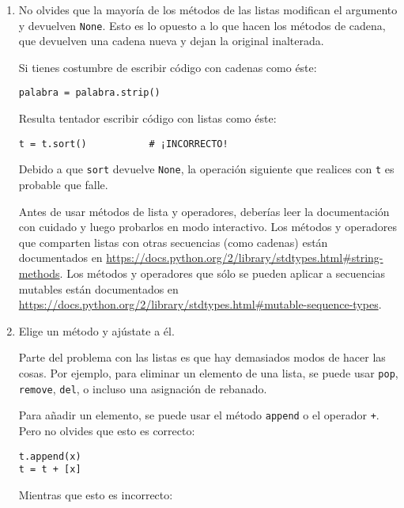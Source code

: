 \begin{enumerate}

\item No olvides que la mayoría de los métodos de las listas modifican el argumento y
devuelven {\tt None}. Esto es lo opuesto a lo que hacen los métodos de cadena,
que devuelven una cadena nueva y dejan la original inalterada.

Si tienes costumbre de escribir código con cadenas como éste:

\beforeverb
\begin{verbatim}
palabra = palabra.strip()
\end{verbatim}
\afterverb

Resulta tentador escribir código con listas como éste:

\beforeverb
\begin{verbatim}
t = t.sort()           # ¡INCORRECTO!
\end{verbatim}
\afterverb


Debido a que {\tt sort} devuelve {\tt None}, la operación
siguiente que realices con {\tt t} es probable que falle.

Antes de usar métodos de lista y operadores, deberías leer la
documentación con cuidado y luego probarlos en modo interactivo. Los
métodos y operadores que comparten listas con otras secuencias (como
cadenas) están documentados en
\url{https://docs.python.org/2/library/stdtypes.html#string-methods}.
Los métodos y operadores que sólo se pueden aplicar a secuencias mutables
están documentados en
\url{https://docs.python.org/2/library/stdtypes.html#mutable-sequence-types}.


\item Elige un método y ajústate a él.

Parte del problema con las listas es que hay demasiados
modos de hacer las cosas. Por ejemplo, para eliminar un elemento de
una lista, se puede usar {\tt pop}, {\tt remove}, {\tt del},
o incluso una asignación de rebanado.

Para añadir un elemento, se puede usar el método {\tt append} o
el operador {\tt +}. Pero no olvides que esto es correcto:

\beforeverb
\begin{verbatim}
t.append(x)
t = t + [x]
\end{verbatim}
\afterverb

Mientras que esto es incorrecto:


\end{enumerate}
